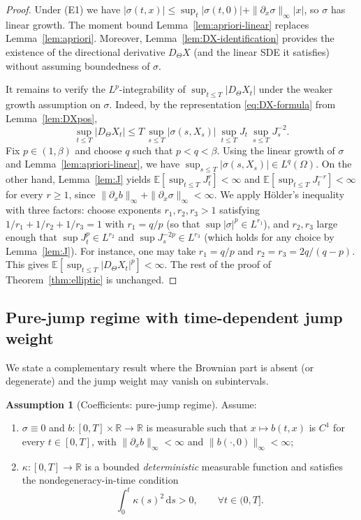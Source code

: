 \documentclass[11pt]{article}
\newcommand{\R}{\mathbb{R}}
\newcommand{\E}{\mathbb{E}}
\newcommand{\1}{\mathbf{1}}
\newcommand{\dd}{\mathrm{d}}
\theoremstyle{plain}
\theoremstyle{definition}
\newtheorem{assumption}[theorem]{Assumption}
\theoremstyle{remark}
\begin{document}
\begin{proof}
Under (E1) we have $|\sigma(t,x)|\le \sup_{t}|\sigma(t,0)|+\|\partial_x\sigma\|_\infty|x|$, so $\sigma$ has linear growth.
The moment bound Lemma~\ref{lem:apriori-linear} replaces Lemma~\ref{lem:apriori}.
Moreover, Lemma~\ref{lem:DX-identification} provides the existence of the directional derivative $D_\Theta X$ (and the linear SDE it satisfies) without assuming boundedness of $\sigma$.


It remains to verify the $L^p$-integrability of $\sup_{t\le T}|D_\Theta X_t|$ under the weaker growth assumption on $\sigma$.
Indeed, by the representation \eqref{eq:DX-formula} from Lemma~\ref{lem:DXpos},
\[
\sup_{t\le T}|D_\Theta X_t|
\le T\,\sup_{s\le T}|\sigma(s,X_s)|\ \sup_{t\le T}J_t\ \sup_{s\le T}J_s^{-2}.
\]
Fix $p\in(1,\beta)$ and choose $q$ such that $p<q<\beta$.
Using the linear growth of $\sigma$ and Lemma~\ref{lem:apriori-linear}, we have $\sup_{s\le T}|\sigma(s,X_s)|\in L^q(\Omega)$.
On the other hand, Lemma~\ref{lem:J} yields $\E[\sup_{t\le T}J_t^{r}]<\infty$ and $\E[\sup_{t\le T}J_t^{-r}]<\infty$ for every $r\ge1$,
since $\|\partial_x b\|_\infty+\|\partial_x\sigma\|_\infty<\infty$.
We apply H\"older's inequality with three factors: choose exponents $r_1,r_2,r_3>1$ satisfying $1/r_1+1/r_2+1/r_3=1$ with $r_1=q/p$ (so that $\sup|\sigma|^p\in L^{r_1}$), and $r_2,r_3$ large enough that $\sup J_t^{p}\in L^{r_2}$ and $\sup J_s^{-2p}\in L^{r_3}$ (which holds for any choice by Lemma~\ref{lem:J}). For instance, one may take $r_1=q/p$ and $r_2=r_3=2q/(q-p)$.
This gives $\E[\sup_{t\le T}|D_\Theta X_t|^p]<\infty$.
The rest of the proof of Theorem~\ref{thm:elliptic} is unchanged.
\end{proof}

\subsection{Pure-jump regime with time-dependent jump weight}

We state a complementary result where the Brownian part is absent (or degenerate) and the jump weight may vanish on subintervals.

\begin{assumption}[Coefficients: pure-jump regime]\label{ass:jump}
Assume:
\begin{enumerate}[label=(J\arabic*),leftmargin=2.7em]
\item $\sigma\equiv 0$ and $b:[0,T]\times\R\to\R$ is measurable such that $x\mapsto b(t,x)$ is $C^1$ for every $t\in[0,T]$, with $\|\partial_x b\|_\infty<\infty$ and $\|b(\cdot,0)\|_\infty<\infty$;
\item $\kappa:[0,T]\to\R$ is a bounded \emph{deterministic} measurable function and satisfies the nondegeneracy-in-time condition
\begin{equation}\label{eq:NDtime}
\int_0^t \kappa(s)^2\,\dd s>0,\qquad \forall t\in(0,T].
\end{equation}
\end{enumerate}
\end{assumption}
\end{document}
